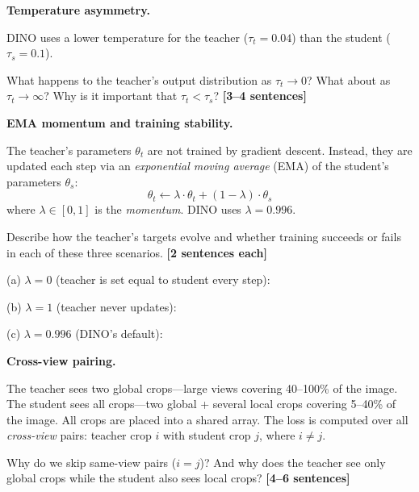 \documentclass{csci1430}
\begin{document}
\pagebreak
\begin{subquestion}[points=3]
\textbf{Temperature asymmetry.}

DINO uses a lower temperature for the teacher ($\tau_t = 0.04$) than the student ($\tau_s = 0.1$).

What happens to the teacher's output distribution as $\tau_t \rightarrow 0$? What about as $\tau_t \rightarrow \infty$? Why is it important that $\tau_t < \tau_s$? \textbf{[3--4 sentences]}
\end{subquestion}

\begin{answer}[height=14]

\end{answer}


\pagebreak
\begin{subquestion}[points=3]
\textbf{EMA momentum and training stability.}

The teacher's parameters $\theta_t$ are not trained by gradient descent. Instead, they are updated each step via an \emph{exponential moving average} (EMA) of the student's parameters $\theta_s$:
\[
\theta_t \leftarrow \lambda \cdot \theta_t + (1 - \lambda) \cdot \theta_s
\]
where $\lambda \in [0, 1]$ is the \emph{momentum}. DINO uses $\lambda = 0.996$.

Describe how the teacher's targets evolve and whether training succeeds or fails in each of these three scenarios. \textbf{[2 sentences each]}
\end{subquestion}

\begin{answer}[height=16]
(a) $\lambda = 0$ (teacher is set equal to student every step):

\vspace{2.5em}
(b) $\lambda = 1$ (teacher never updates):

\vspace{2.5em}
(c) $\lambda = 0.996$ (DINO's default):
\end{answer}


\pagebreak
\begin{subquestion}[points=3]
\textbf{Cross-view pairing.}

The teacher sees two global crops---large views covering 40--100\% of the image. The student sees all crops---two global + several local crops covering 5--40\% of the image. All crops are placed into a shared array. The loss is computed over all \emph{cross-view} pairs: teacher crop $i$ with student crop $j$, where $i \neq j$.

Why do we skip same-view pairs ($i = j$)? And why does the teacher see only global crops while the student also sees local crops? \textbf{[4--6 sentences]}
\end{subquestion}
\end{document}
